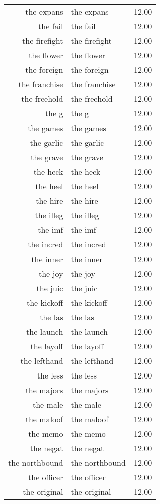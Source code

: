 \begin{table}[ht]
\begin{tabular}{rlr}
  the expans & the expans & 12.00 \\ 
  the fail & the fail & 12.00 \\ 
  the firefight & the firefight & 12.00 \\ 
  the flower & the flower & 12.00 \\ 
  the foreign & the foreign & 12.00 \\ 
  the franchise & the franchise & 12.00 \\ 
  the freehold & the freehold & 12.00 \\ 
  the g & the g & 12.00 \\ 
  the games & the games & 12.00 \\ 
  the garlic & the garlic & 12.00 \\ 
  the grave & the grave & 12.00 \\ 
  the heck & the heck & 12.00 \\ 
  the heel & the heel & 12.00 \\ 
  the hire & the hire & 12.00 \\ 
  the illeg & the illeg & 12.00 \\ 
  the imf & the imf & 12.00 \\ 
  the incred & the incred & 12.00 \\ 
  the inner & the inner & 12.00 \\ 
  the joy & the joy & 12.00 \\ 
  the juic & the juic & 12.00 \\ 
  the kickoff & the kickoff & 12.00 \\ 
  the las & the las & 12.00 \\ 
  the launch & the launch & 12.00 \\ 
  the layoff & the layoff & 12.00 \\ 
  the lefthand & the lefthand & 12.00 \\ 
  the less & the less & 12.00 \\ 
  the majors & the majors & 12.00 \\ 
  the male & the male & 12.00 \\ 
  the maloof & the maloof & 12.00 \\ 
  the memo & the memo & 12.00 \\ 
  the negat & the negat & 12.00 \\ 
  the northbound & the northbound & 12.00 \\ 
  the officer & the officer & 12.00 \\ 
  the original & the original & 12.00 \\ 

\end{tabular}
\end{table}
